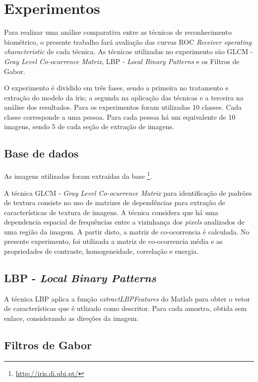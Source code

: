 \chapter{Experimentos}\label{cap:metodologia}

Para realizar uma análise comparativa entre as técnicas de reconhecimento biométrico, o presente trabalho fará avaliação das curvas ROC \textit{Receiver operating characteristic} de cada técnica. As técnicas utilizadas no experimento são GLCM - \textit{Gray Level Co-ocurrence Matrix}, LBP - \textit{Local Binary Patterns} e os Filtros de Gabor. 

O experimento é dividido em três fases, sendo a primeira no tratamento e extração do modelo da íris; a segunda na aplicação das técnicas e a terceira na análise dos resultados. Para os experimentos foram utilizadas 10 classes. Cada classe corresponde a uma pessoa. Para cada pessoa há um equivalente de 10 imagens, sendo 5 de cada seção de extração de imagens. 

\section{Base de dados}\label{sec:bd}

As imagens utilizadas foram extraídas da base \footnote{\url{http://iris.di.ubi.pt/}}. 

A técnica GLCM - \textit{Gray Level Co-ocurrence Matrix} para identificação de padrões de textura consiste no uso de matrizes de dependências para extração de características de textura de imagens. A técnica considera que há uma dependencia espacial de frequências entre a vizinhança dos \textit{pixels} analizados de uma região da imagem. A partir disto, a matriz de co-ocorrencia é calculada. No presente experimento, foi utilizada a matriz de co-ocorrencia média e as propriedades de contraste, homogeneidade, correlação e energia. 

\section{LBP - \textit{Local Binary Patterns}}\label{sec:lbp}
A técnica LBP aplica a função \textit{extractLBPFeatures} do Matlab para obter o vetor de características que é utlizado como descritor. Para cada amostra, obtida sem enlace, considerando as direções da imagem.  

\section{Filtros de Gabor}\label{sec:gabor}
